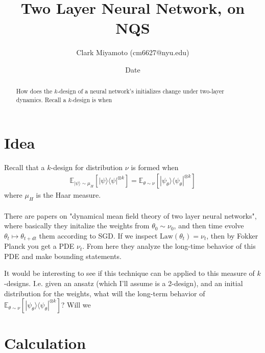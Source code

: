 \documentclass[12pt,fleqn]{article}
\title{Two Layer Neural Network, on NQS}
\author{Clark Miyamoto (cm6627@nyu.edu)}
\date{Date}
\numberwithin{equation}{section} %
\begin{document}
\maketitle

\begin{abstract}
	How does the $k$-design of a neural network's initializes change under two-layer dynamics. Recall a $k$-design is when 
\end{abstract}
\section{Idea}
Recall that a $k$-design for distribution $\nu$ is formed when
\begin{align}
	\mathbb E_{|\psi \rangle \sim \mu_H} [|\psi\rangle\langle\psi|^{\otimes k}]  = \mathbb E_{\theta\sim \nu}[| \psi_\theta \rangle \langle \psi_\theta|^{\otimes k}]
\end{align}
where $\mu_H$ is the Haar measure.\\
\\
There are papers on "dynamical mean field theory of two layer neural networks", where basically they initalize the weights from $\theta_0 \sim \nu_0$, and then time evolve $\theta_t \mapsto \theta_{t+dt}$ them according to SGD. If we inspect $\text{Law}(\theta_t) = \nu_t$, then by Fokker Planck you get a PDE $\nu_t$. From here they analyze the long-time behavior of this PDE and make bounding statements.

It would be interesting to see if this technique can be applied to this measure of $k$-designs. I.e. given an ansatz (which I'll assume is a 2-design), and an initial distribution for the weights, what will the long-term behavior of $\mathbb E_{\theta\sim \nu}[| \psi_\theta \rangle \langle \psi_\theta|^{\otimes k}]$? Will we 
\section{Calculation}
\end{document}
